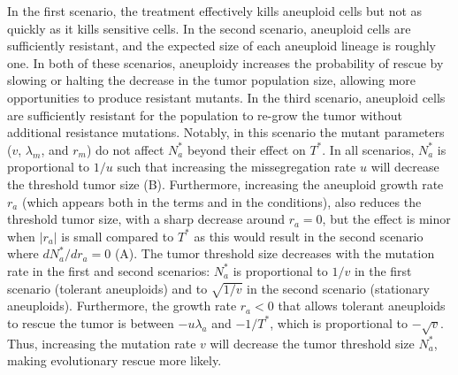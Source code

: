 \documentclass[12pt]{extarticle}
\renewcommand{\Delta}{r}
\begin{document}
In the first scenario, the treatment effectively kills aneuploid cells but not as quickly as it kills sensitive cells. 
In the second scenario, aneuploid cells are sufficiently resistant, and the expected size of each aneuploid lineage is roughly one.
In both of these scenarios, aneuploidy increases the probability of rescue by slowing or halting the decrease in the tumor population size, allowing more opportunities to produce resistant mutants.
In the third scenario, aneuploid cells are sufficiently resistant for the population to re-grow the tumor without additional resistance mutations.
Notably, in this scenario the mutant parameters ($v$, $\lambda_m$, and $\Delta_m$) do not affect $N_a^*$ beyond their effect on $T^*$.
In all scenarios, $N_a^*$ is proportional to $1/u$ such that increasing the missegregation rate $u$ will decrease the threshold tumor size (B).
Furthermore, increasing the aneuploid growth rate $\Delta_a$ (which appears both in the terms and in the conditions), also reduces the threshold tumor size, with a sharp decrease around $\Delta_a=0$, but the effect is minor when $|\Delta_a|$ is small compared to $T^*$ as this would result in the second scenario where  $dN_a^*/d\Delta_a=0$ (A). 
The tumor threshold size decreases with the mutation rate in the first and second scenarios: $N_a^*$ is proportional to $1/v$ in the first scenario (tolerant aneuploids) and to $\sqrt{1/v}$ in the second scenario (stationary aneuploids). Furthermore, the growth rate $\Delta_a<0$ that allows tolerant aneuploids to rescue the tumor is between $-u\lambda_a$ and  $-1/T^*$, which is proportional to $-\sqrt{v}$. Thus, increasing the mutation rate $v$ will decrease the tumor threshold size $N^*_a$, making evolutionary rescue more likely. %
\end{document}
